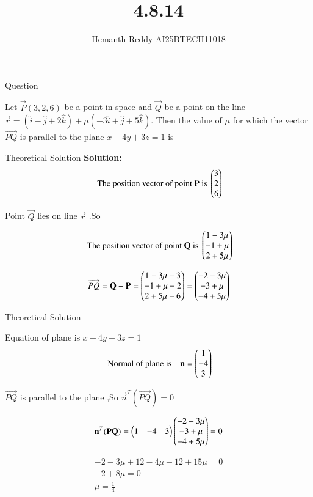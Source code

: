 \documentclass{beamer}
\title %
{ 4.8.14}
\author %
{Hemanth Reddy-AI25BTECH11018}
\begin{document}
\frame{\titlepage}
\begin{frame}{Question}

Let $\vec{P} (3,2,6)$ be a point in space and $\vec{Q}$ be a point on the line
$ \vec{r} = (\hat{i} - \hat{j} + 2\hat{k}) + \mu(-3\hat{i} + \hat{j} + 5\hat{k}). $
Then the value of $\mu$ for which the vector $\overrightarrow{PQ}$ is parallel to the plane $x - 4y + 3z = 1$ is 
\end{frame}



\begin{frame}{Theoretical Solution}
\textbf{Solution:}\\


\begin{align}
   \text{ The position vector of point }  \mathbf{P} \text{ is }
 \begin{pmatrix} 3 \\ 2\\ 6 \end{pmatrix} 
\end{align}

Point $\vec{Q}$ lies on line $\vec{r}$ .So

\begin{align}
   \text{ The position vector of point }  \mathbf{Q} \text{ is }
 \begin{pmatrix} 1-3\mu\\ -1+\mu \\ 2+5\mu \end{pmatrix} 
\end{align}

\begin{align}
    \overrightarrow{PQ} = \mathbf{Q} -\mathbf{P} = \begin{pmatrix} 1-3\mu-3\\ -1+\mu -2\\ 2+5\mu -6\end{pmatrix} = \begin{pmatrix} -2-3\mu\\ -3+\mu \\ -4+5\mu \end{pmatrix} 
\end{align}

\end{frame}

\begin{frame}{Theoretical Solution}

Equation of plane is $x - 4y + 3z = 1$ 
\begin{align}
    \text{ Normal of plane is} \quad \mathbf{n} =\begin{pmatrix} 1 \\ -4\\ 3 \end{pmatrix} 
\end{align}

$\overrightarrow{PQ}$ is parallel to the plane ,So $\vec{n}^{T}(\vec{PQ})=0$

\begin{align}
   \mathbf{n}^{T}(\mathbf{PQ})= \begin{pmatrix} 1 & -4 & 3 \end{pmatrix} \begin{pmatrix} -2-3\mu\\ -3+\mu \\ -4+5\mu \end{pmatrix} =0
\end{align}

\begin{align}
    -2-3\mu+12-4\mu-12+15\mu=0\\
    -2+8\mu=0\\
    \mu=\frac{1}{4}
\end{align}

\end{frame}
\end{document}
